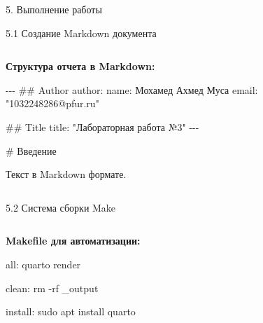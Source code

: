 \documentclass[
  ignorenonframetext,
  aspectratio=169,
]{beamer}
\newenvironment{Shaded}{\begin{snugshade}}{\end{snugshade}}
\newcommand{\AttributeTok}[1]{\textcolor[rgb]{0.40,0.45,0.13}{#1}}
\newcommand{\CommentTok}[1]{\textcolor[rgb]{0.37,0.37,0.37}{#1}}
\newcommand{\DecValTok}[1]{\textcolor[rgb]{0.68,0.00,0.00}{#1}}
\newcommand{\ErrorTok}[1]{\textcolor[rgb]{0.68,0.00,0.00}{#1}}
\newcommand{\FunctionTok}[1]{\textcolor[rgb]{0.28,0.35,0.67}{#1}}
\newcommand{\KeywordTok}[1]{\textcolor[rgb]{0.00,0.23,0.31}{#1}}
\newcommand{\NormalTok}[1]{\textcolor[rgb]{0.00,0.23,0.31}{#1}}
\newcommand{\PreprocessorTok}[1]{\textcolor[rgb]{0.68,0.00,0.00}{#1}}
\newcommand{\StringTok}[1]{\textcolor[rgb]{0.13,0.47,0.30}{#1}}
\begin{document}
\begin{frame}[fragile]{5. Выполнение работы}
\label{ux432ux44bux43fux43eux43bux43dux435ux43dux438ux435-ux440ux430ux431ux43eux442ux44b}
\begin{block}{5.1 Создание Markdown документа}
\label{ux441ux43eux437ux434ux430ux43dux438ux435-markdown-ux434ux43eux43aux443ux43cux435ux43dux442ux430}
\begin{columns}[c]
\begin{column}{0.6\textwidth}
\textbf{Структура отчета в Markdown:}

\begin{Shaded}
\begin{Highlighting}[]
\PreprocessorTok{{-}{-}{-}}
\CommentTok{\#\# Author}
\FunctionTok{author}\KeywordTok{:}
\AttributeTok{  }\FunctionTok{name}\KeywordTok{:}\AttributeTok{ Мохамед Ахмед Муса}
\AttributeTok{  }\FunctionTok{email}\KeywordTok{:}\AttributeTok{ }\StringTok{"1032248286@pfur.ru"}

\CommentTok{\#\# Title}
\FunctionTok{title}\KeywordTok{:}\AttributeTok{ }\StringTok{"Лабораторная работа №3"}
\PreprocessorTok{{-}{-}{-}}

\CommentTok{\# Введение}

\AttributeTok{Текст в Markdown формате.}
\end{Highlighting}
\end{Shaded}
\end{column}

\begin{column}{0.4\textwidth}
\end{column}
\end{columns}
\end{block}

\begin{block}{5.2 Система сборки Make}
\label{ux441ux438ux441ux442ux435ux43cux430-ux441ux431ux43eux440ux43aux438-make-1}
\begin{columns}[c]
\begin{column}{0.6\textwidth}
\textbf{Makefile для автоматизации:}

\begin{Shaded}
\begin{Highlighting}[]
\DecValTok{all:}
\ErrorTok{    }\NormalTok{quarto render}

\DecValTok{clean:}
\ErrorTok{    }\NormalTok{rm {-}rf \_output}

\DecValTok{install:}
\ErrorTok{    }\NormalTok{sudo apt install quarto}
\end{Highlighting}
\end{Shaded}


\end{column}
\end{columns}
\end{block}
\end{frame}
\end{document}
